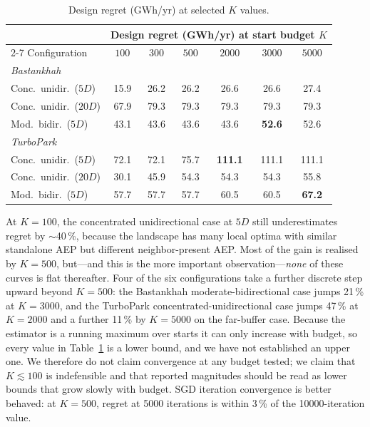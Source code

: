 \documentclass[wes, manuscript]{copernicus}
\begin{document}
\begin{table}[htbp]
    \centering
    \caption{Design regret (GWh/yr) at selected $K$ values.}
    \label{tab:convergence}
    \begin{tabular}{lcccccc}
        \toprule
        & \multicolumn{6}{c}{Design regret (GWh/yr) at start budget $K$} \\
        \cmidrule(l){2-7}
        Configuration & $100$ & $300$ & $500$ & $2000$ & $3000$ & $5000$ \\
        \midrule
        \multicolumn{7}{l}{\emph{Bastankhah}} \\
        \quad Conc.\ unidir.\ ($5D$)  & 15.9 & 26.2 & 26.2 & 26.6 & 26.6 & 27.4 \\
        \quad Conc.\ unidir.\ ($20D$) & 67.9 & 79.3 & 79.3 & 79.3 & 79.3 & 79.3 \\
        \quad Mod.\ bidir.\ ($5D$)    & 43.1 & 43.6 & 43.6 & 43.6 & \textbf{52.6} & 52.6 \\
        \midrule
        \multicolumn{7}{l}{\emph{TurboPark}} \\
        \quad Conc.\ unidir.\ ($5D$)  & 72.1 & 72.1 & 75.7 & \textbf{111.1} & 111.1 & 111.1 \\
        \quad Conc.\ unidir.\ ($20D$) & 30.1 & 45.9 & 54.3 & 54.3 & 54.3 & 55.8 \\
        \quad Mod.\ bidir.\ ($5D$)    & 57.7 & 57.7 & 57.7 & 60.5 & 60.5 & \textbf{67.2} \\
        \bottomrule
    \end{tabular}
\end{table}

At $K = 100$, the concentrated unidirectional case at $5D$ still underestimates regret by $\sim$40\,\%, because the landscape has many local optima with similar standalone AEP but different neighbor-present AEP.
Most of the gain is realised by $K = 500$, but---and this is the more important observation---\emph{none} of these curves is flat thereafter.
Four of the six configurations take a further discrete step upward beyond $K = 500$: the Bastankhah moderate-bidirectional case jumps 21\,\% at $K = 3000$, and the TurboPark concentrated-unidirectional case jumps 47\,\% at $K = 2000$ and a further 11\,\% by $K = 5000$ on the far-buffer case.
Because the estimator is a running maximum over starts it can only increase with budget, so every value in Table~\ref{tab:convergence} is a lower bound, and we have not established an upper one.
We therefore do not claim convergence at any budget tested; we claim that $K \lesssim 100$ is indefensible and that reported magnitudes should be read as lower bounds that grow slowly with budget.
SGD iteration convergence is better behaved: at $K = 500$, regret at 5000 iterations is within 3\,\% of the 10000-iteration value.
\end{document}
